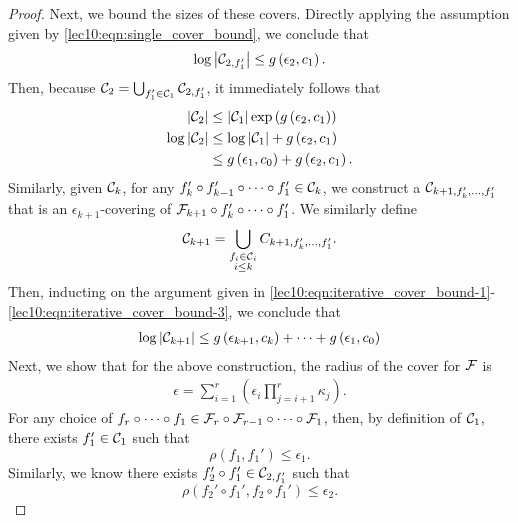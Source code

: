 \begin{proof}
Next, we bound the sizes of these covers. Directly applying the assumption given by \eqref{lec10:eqn:single_cover_bound}, we conclude that
\begin{align}
    \log \left\lvert\mathcal C_{2, f_1'}\right\rvert \leq g\left(\epsilon_2, c_1\right).
\end{align}
Then, because $\mathcal C_2 = \bigcup_{f_1'\in \mathcal C_1}\mathcal C_{2,f_1'}$, it immediately follows that
\begin{align}
    \left\lvert\mathcal C_{2}\right\rvert &\leq \left\lvert\mathcal C_{1}\right\rvert \exp\left(g\left(\epsilon_2, c_1\right)\right) \label{lec10:eqn:iterative_cover_bound-1}\\
    \log\left\lvert\mathcal C_{2}\right\rvert &\leq \log\left\lvert\mathcal C_{1}\right\rvert + g\left(\epsilon_2, c_1\right) \\
    &\leq g\left(\epsilon_1, c_0\right) + g\left(\epsilon_2, c_1\right).  \label{lec10:eqn:iterative_cover_bound-3}
\end{align}
Similarly, given $\mathcal C_k$, for any $f_k' \circ f_{k-1}' \circ \cdots \circ f_1' \in \mathcal C_k$, we construct a $\mathcal C_{k+1, f_k', \dots, f_1'}$ that is an $\epsilon_{k+1}$-covering of $\mathcal F_{k+1} \circ f_k' \circ \cdots \circ f_1'$. We similarly define 
\begin{equation}
    \mathcal C_{k+1} = \bigcup_{\substack{f_i \in \mathcal C_i \\ i \leq k}} C_{k+1, f_k', \dots, f_1'}.
\end{equation}
Then, inducting on the argument given in \eqref{lec10:eqn:iterative_cover_bound-1}-\eqref{lec10:eqn:iterative_cover_bound-3}, we conclude that
\begin{align}
    \log \left\lvert\mathcal C_{k+1}\right\rvert \leq g\left(\epsilon_{k+1}, c_k\right) + \cdots + g\left(\epsilon_1, c_0\right)
\end{align}
Next, we show that for the above construction, the radius of the cover for $\mathcal F$ is
\begin{align}
    \epsilon = \sum_{i=1}^{r} \left(\epsilon_i \prod_{j=i+1}^{r}\kappa_{j}\right).
\end{align}
For any choice of $f_r \circ \cdots \circ f_1 \in \mathcal F_r \circ \mathcal F_{r-1} \circ \cdots \circ \mathcal F_1$,  then, by definition of $\mathcal C_1$, there exists $f_1' \in \mathcal C_1$ such that 
\begin{equation}
    \rho(f_1, f_1') \leq \epsilon_1.
\end{equation} 
Similarly, we know there exists $f_2' \circ f_1' \in \mathcal C_{2, f_1'}$ such that 
\begin{equation} 
    \rho\left(f_2' \circ f_1', f_2\circ f_1' \right) \leq \epsilon_2.
\end{equation}

\end{proof}
